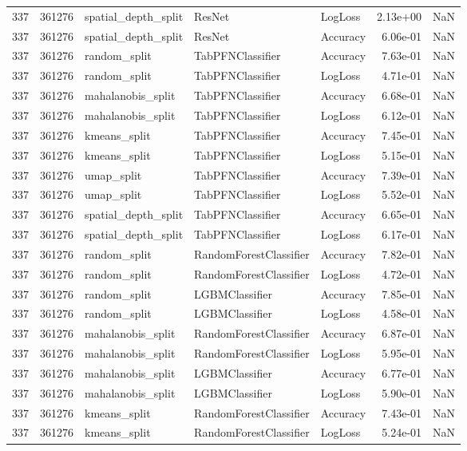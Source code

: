 \begin{tabular}{rrlllrr}
337 & 361276 & spatial\_depth\_split & ResNet & LogLoss & 2.13e+00 & NaN \\
337 & 361276 & spatial\_depth\_split & ResNet & Accuracy & 6.06e-01 & NaN \\
337 & 361276 & random\_split & TabPFNClassifier & Accuracy & 7.63e-01 & NaN \\
337 & 361276 & random\_split & TabPFNClassifier & LogLoss & 4.71e-01 & NaN \\
337 & 361276 & mahalanobis\_split & TabPFNClassifier & Accuracy & 6.68e-01 & NaN \\
337 & 361276 & mahalanobis\_split & TabPFNClassifier & LogLoss & 6.12e-01 & NaN \\
337 & 361276 & kmeans\_split & TabPFNClassifier & Accuracy & 7.45e-01 & NaN \\
337 & 361276 & kmeans\_split & TabPFNClassifier & LogLoss & 5.15e-01 & NaN \\
337 & 361276 & umap\_split & TabPFNClassifier & Accuracy & 7.39e-01 & NaN \\
337 & 361276 & umap\_split & TabPFNClassifier & LogLoss & 5.52e-01 & NaN \\
337 & 361276 & spatial\_depth\_split & TabPFNClassifier & Accuracy & 6.65e-01 & NaN \\
337 & 361276 & spatial\_depth\_split & TabPFNClassifier & LogLoss & 6.17e-01 & NaN \\
337 & 361276 & random\_split & RandomForestClassifier & Accuracy & 7.82e-01 & NaN \\
337 & 361276 & random\_split & RandomForestClassifier & LogLoss & 4.72e-01 & NaN \\
337 & 361276 & random\_split & LGBMClassifier & Accuracy & 7.85e-01 & NaN \\
337 & 361276 & random\_split & LGBMClassifier & LogLoss & 4.58e-01 & NaN \\
337 & 361276 & mahalanobis\_split & RandomForestClassifier & Accuracy & 6.87e-01 & NaN \\
337 & 361276 & mahalanobis\_split & RandomForestClassifier & LogLoss & 5.95e-01 & NaN \\
337 & 361276 & mahalanobis\_split & LGBMClassifier & Accuracy & 6.77e-01 & NaN \\
337 & 361276 & mahalanobis\_split & LGBMClassifier & LogLoss & 5.90e-01 & NaN \\
337 & 361276 & kmeans\_split & RandomForestClassifier & Accuracy & 7.43e-01 & NaN \\
337 & 361276 & kmeans\_split & RandomForestClassifier & LogLoss & 5.24e-01 & NaN \\

\end{tabular}
